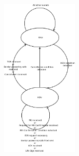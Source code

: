 \documentclass{beamer}
\begin{document}
\begin{frame}[plain]
\begin{center}
\includegraphics[width=8cm, height=8cm]{RBCTypeProcess.png}
\end{center}

\end{frame}
\end{document}
